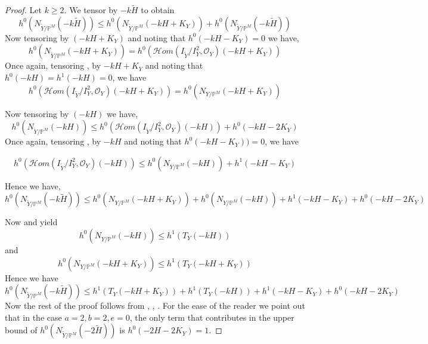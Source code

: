 \documentclass[11pt,twoside]{amsart}
\theoremstyle{plain}
\numberwithin{equation}{section}
\theoremstyle{definition}
\begin{document}
\begin{proof}
   Let $k \geq 2$. We tensor  by $-k\widetilde{H}$ to obtain
    $$h^0(N_{\widetilde{Y}/\mathbb{P}^M}(-k\widetilde{H})) \leq  h^0(N_{\widetilde{Y}/\mathbb{P}^M}(-kH+K_Y)) + h^0(N_{\widetilde{Y}/\mathbb{P}^M}(-k\widetilde{H}))$$
    Now tensoring  by $(-kH+K_Y)$ and noting that $h^0(-kH-K_Y) = 0$ we have,
    $$h^0(N_{\widetilde{Y}/\mathbb{P}^M}(-kH+K_Y)) = h^0(\mathcal{H}om(I_{\widetilde{Y}}/I_{Y}^2, \mathcal{O}_Y)(-kH+K_Y))$$
    Once again, tensoring , by $-kH+K_Y$ and noting that $h^0(-kH) = h^1(-kH) = 0$, we have 
    $$h^0(\mathcal{H}om(I_{\widetilde{Y}}/I_{Y}^2, \mathcal{O}_Y)(-kH+K_Y)) = h^0(N_{Y/\mathbb{P}^M}(-kH+K_Y))$$

    
    Now tensoring  by $(-kH)$ we have,
    $$h^0(N_{\widetilde{Y}/\mathbb{P}^M}(-kH)) \leq h^0(\mathcal{H}om(I_{\widetilde{Y}}/I_{Y}^2, \mathcal{O}_Y)(-kH))+h^0(-kH-2K_Y)$$
    Once again, tensoring , by $-kH$ and noting that $h^0(-kH-K_Y)) = 0$, we have 
   

\color{black}
    $$h^0(\mathcal{H}om(I_{\widetilde{Y}}/I_{Y}^2, \mathcal{O}_Y)(-kH)) \leq h^0(N_{Y/\mathbb{P}^M}(-kH))+h^1(-kH-K_Y)$$

\color{black}
    Hence we have,
    $$h^0(N_{\widetilde{Y}/\mathbb{P}^M}(-k\widetilde{H})) \leq  h^0(N_{Y/\mathbb{P}^M}(-kH+K_Y)) + h^0(N_{Y/\mathbb{P}^M}(-kH)) +  h^1(-kH-K_Y) + h^0(-kH-2K_Y)$$

Now  and  yield %
$$h^0(N_{Y/\mathbb{P}^M}(-kH)) \leq h^1(T_Y(-kH)) $$
and
$$h^0(N_{Y/\mathbb{P}^M}(-kH+K_Y)) \leq h^1(T_Y(-kH+K_Y))$$
Hence we have 
$$h^0(N_{\widetilde{Y}/\mathbb{P}^M}(-k\widetilde{H})) \leq h^1(T_Y(-kH+K_Y)) + h^1(T_Y(-kH)) +  h^1(-kH-K_Y) + h^0(-kH-2K_Y) $$
Now the rest of the proof follows from , , . For the ease of the reader we point out that in the case $a = 2, b = 2, e = 0$, the only term that contributes in the upper bound of $h^0(N_{\widetilde{Y}/\mathbb{P}^M}(-2\widetilde{H}))$ is $h^0(-2H-2K_Y) = 1$. 
\end{proof}
\end{document}
